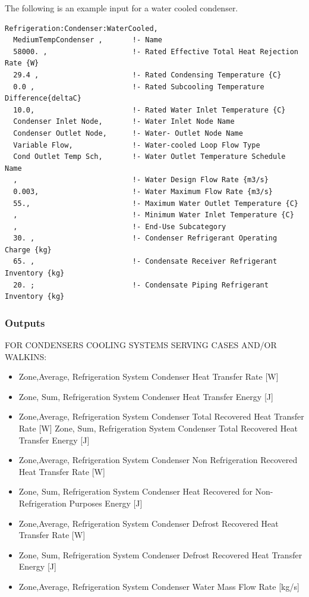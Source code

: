 The following is an example input for a water cooled condenser.

\begin{lstlisting}
Refrigeration:Condenser:WaterCooled,
  MediumTempCondenser ,       !- Name
  58000. ,                    !- Rated Effective Total Heat Rejection Rate {W}
  29.4 ,                      !- Rated Condensing Temperature {C}
  0.0 ,                       !- Rated Subcooling Temperature Difference{deltaC}
  10.0,                       !- Rated Water Inlet Temperature {C}
  Condenser Inlet Node,       !- Water Inlet Node Name
  Condenser Outlet Node,      !- Water- Outlet Node Name
  Variable Flow,              !- Water-cooled Loop Flow Type
  Cond Outlet Temp Sch,       !- Water Outlet Temperature Schedule Name
  ,                           !- Water Design Flow Rate {m3/s}
  0.003,                      !- Water Maximum Flow Rate {m3/s}
  55.,                        !- Maximum Water Outlet Temperature {C}
  ,                           !- Minimum Water Inlet Temperature {C}
  ,                           !- End-Use Subcategory
  30. ,                       !- Condenser Refrigerant Operating Charge {kg}
  65. ,                       !- Condensate Receiver Refrigerant Inventory {kg}
  20. ;                       !- Condensate Piping Refrigerant Inventory {kg}
\end{lstlisting}

\subsubsection{Outputs}\label{outputs-8-007}

FOR CONDENSERS COOLING SYSTEMS SERVING CASES AND/OR WALKINS:

\begin{itemize}
\item
  Zone,Average, Refrigeration System Condenser Heat Transfer Rate {[}W{]}
\item
  Zone, Sum, Refrigeration System Condenser Heat Transfer Energy {[}J{]}
\item
  Zone,Average, Refrigeration System Condenser Total Recovered Heat Transfer Rate {[}W{]} Zone, Sum, Refrigeration System Condenser Total Recovered Heat Transfer Energy {[}J{]}
\item
  Zone,Average, Refrigeration System Condenser Non Refrigeration Recovered Heat Transfer Rate {[}W{]}
\item
  Zone, Sum, Refrigeration System Condenser Heat Recovered for Non-Refrigeration Purposes Energy {[}J{]}
\item
  Zone,Average, Refrigeration System Condenser Defrost Recovered Heat Transfer Rate {[}W{]}
\item
  Zone, Sum, Refrigeration System Condenser Defrost Recovered Heat Transfer Energy {[}J{]}
\item
  Zone,Average, Refrigeration System Condenser Water Mass Flow Rate {[}kg/s{]}
\end{itemize}

